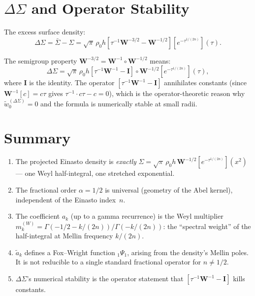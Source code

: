 \documentclass{article}
\begin{document}
\section{$\Delta\Sigma$ and Operator Stability}
\label{sec:ds}

The excess surface density:
\begin{equation}
\Delta\Sigma = \bar\Sigma - \Sigma
= \sqrt\pi\,\rho_0 h\left[
\tau^{-1}\mathbf{W}^{-3/2} - \mathbf{W}^{-1/2}\right]
[e^{-\tau^{1/(2n)}}](\tau).
\end{equation}

The semigroup property $\mathbf{W}^{-3/2}=\mathbf{W}^{-1}\circ\mathbf{W}^{-1/2}$
means:
\begin{equation}
\Delta\Sigma = \sqrt\pi\,\rho_0 h\left[
\tau^{-1}\mathbf{W}^{-1} - \mathbf{I}\right]\circ
\mathbf{W}^{-1/2}[e^{-\tau^{1/(2n)}}](\tau),
\end{equation}
where $\mathbf{I}$ is the identity. The operator
$[\tau^{-1}\mathbf{W}^{-1}-\mathbf{I}]$ annihilates constants (since
$\mathbf{W}^{-1}[c]=c\tau$ gives $\tau^{-1}\cdot c\tau - c = 0$), which is
the operator-theoretic reason why $\tilde{w}_0^{(\Delta\Sigma)}=0$ and the
formula is numerically stable at small radii.

\section{Summary}

\begin{enumerate}
\item The projected Einasto density is \emph{exactly}
$\Sigma = \sqrt\pi\,\rho_0 h\,\mathbf{W}^{-1/2}[e^{-\tau^{1/(2n)}}](x^2)$
--- one Weyl half-integral, one stretched exponential.
\item The fractional order $\alpha=1/2$ is universal (geometry of the Abel
kernel), independent of the Einasto index~$n$.
\item The coefficient $a_k$ (up to a gamma recurrence) is the Weyl multiplier
$m_k^{(W)}=\Gamma(-1/2-k/(2n))/\Gamma(-k/(2n))$: the ``spectral weight'' of
the half-integral at Mellin frequency $k/(2n)$.
\item $\tilde{a}_k$ defines a Fox--Wright function ${}_1\Psi_1$, arising from
the density's Mellin poles. It is not reducible to a single standard fractional
operator for $n\neq 1/2$.
\item $\Delta\Sigma$'s numerical stability is the operator statement that
$[\tau^{-1}\mathbf{W}^{-1}-\mathbf{I}]$ kills constants.
\end{enumerate}
\end{document}
